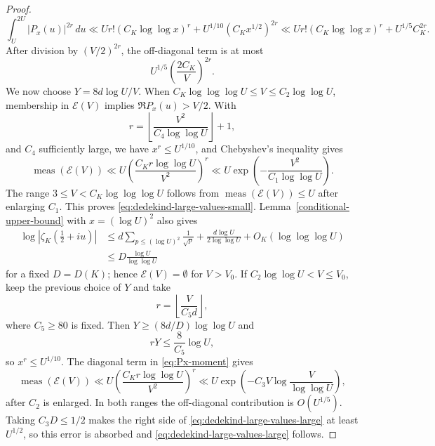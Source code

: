 \documentclass[twoside,reqno,11pt,a4paper]{amsart}
\numberwithin{equation}{section}
\theoremstyle{plain}
\theoremstyle{definition}
\theoremstyle{remark}
\renewcommand{\le}{\leqslant}
\renewcommand{\ge}{\geqslant}
\begin{document}
\begin{proof}
\begin{equation}\label{eq:Px-moment}
        \int_U^{2U}|P_x(u)|^{2r}\,du
        \ll
        U r!\left(C_K\log\log x\right)^r
        +U^{1/10}(C_Kx^{1/2})^{2r}
        \ll
        U r!\left(C_K\log\log x\right)^r+U^{1/5}C_K^{2r}.
\end{equation}
After division by $(V/2)^{2r}$, the off-diagonal term is at most
\begin{equation*}
        U^{1/5}\left(\frac{2C_K}{V}\right)^{2r}.
\end{equation*}
We now choose $Y=8d\log U/V$.  When $C_K\log\log\log U\le V\le C_2\log\log U$, membership in $\mathcal E(V)$ implies $\Re P_x(u)>V/2$.  With
\begin{equation*}
        r=\left\lfloor\frac{V^2}{C_4\log\log U}\right\rfloor+1,
\end{equation*}
and $C_4$ sufficiently large, we have $x^r\le U^{1/10}$, and Chebyshev's inequality gives
\begin{equation*}
        \operatorname{meas}(\mathcal E(V))
        \ll
        U\left(\frac{C_Kr\log\log U}{V^2}\right)^r
        \ll
        U\exp\left(-\frac{V^2}{C_1\log\log U}\right).
\end{equation*}
The range $3\le V<C_K\log\log\log U$ follows from $\operatorname{meas}(\mathcal E(V))\le U$ after enlarging $C_1$.  This proves \eqref{eq:dedekind-large-values-small}.  Lemma~\ref{conditional-upper-bound} with $x=(\log U)^2$ also gives
\begin{align*}
\log\left|\zeta_K\left(\frac12+iu\right)\right|
&\le d\sum_{p\le(\log U)^2}\frac1{\sqrt p}
+\frac{d\log U}{2\log\log U}+O_K(\log\log\log U)\\
&\le D\frac{\log U}{\log\log U}
\end{align*}
for a fixed $D=D(K)$; hence $\mathcal E(V)=\emptyset$ for $V>V_0$.  If $C_2\log\log U<V\le V_0$, keep the previous choice of $Y$ and take
\begin{equation*}
        r=\left\lfloor\frac{V}{C_5d}\right\rfloor,
\end{equation*}
where $C_5\ge80$ is fixed.  Then $Y\ge(8d/D)\log\log U$ and
\begin{equation*}
        rY\le\frac{8}{C_5}\log U,
\end{equation*}
so $x^r\le U^{1/10}$.  The diagonal term in \eqref{eq:Px-moment} gives
\begin{equation*}
        \operatorname{meas}(\mathcal E(V))
        \ll
        U\left(\frac{C_Kr\log\log U}{V^2}\right)^r
        \ll
        U\exp\left(-C_3V\log\frac{V}{\log\log U}\right),
\end{equation*}
after $C_2$ is enlarged.  In both ranges the off-diagonal contribution is $O(U^{1/5})$.  Taking $C_3D\le1/2$ makes the right side of \eqref{eq:dedekind-large-values-large} at least $U^{1/2}$, so this error is absorbed and \eqref{eq:dedekind-large-values-large} follows.


\end{proof}
\end{document}
